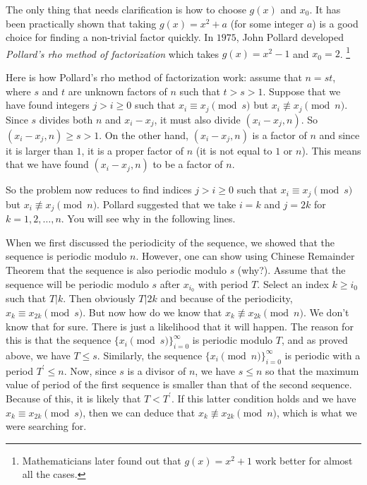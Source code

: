 \documentclass{subfiles}
\begin{document}
	The only thing that needs clarification is how to choose $g(x)$ and $x_0$. It has been practically shown that taking $g(x)=x^2+a$ (for some integer $a$) is a good choice for finding a non-trivial factor quickly.
	In $1975$, John Pollard developed \emph{Pollard's rho method of factorization} which takes $g(x)=x^2-1$ and $x_0=2$. \footnote{Mathematicians later found out that $g(x)=x^2+1$ work better for almost all the cases.}

	Here is how Pollard's rho method of factorization work: assume that $n=st$, where $s$ and $t$ are unknown factors of $n$ such that $t>s>1$. Suppose that we have found integers $j>i\geq 0$ such that $x_i \equiv x_j \pmod s$ but $x_i \not \equiv x_j \pmod n$. Since $s$ divides both $n$ and $x_i-x_j$, it must also divide $(x_i-x_j, n)$. So $(x_i-x_j, n) \geq s >1$. On the other hand, $(x_i-x_j, n)$ is a factor of $n$ and since it is larger than $1$, it is a proper factor of $n$ (it is not equal to $1$ or $n$). This means that we have found $(x_i-x_j, n)$ to be a factor of $n$.

	So the problem now reduces to find indices $j>i \geq 0$ such that $x_i \equiv x_j \pmod s$ but $x_i \not \equiv x_j \pmod n$. Pollard suggested that we take $i=k$ and $j=2k$ for $k=1,2,\ldots, n$. You will see why in the following lines.

	When we first discussed the periodicity of the sequence, we showed that the sequence is periodic modulo $n$. However, one can show using Chinese Remainder Theorem that the sequence is also periodic modulo $s$ (why?). Assume that the sequence will be periodic modulo $s$ after $x_{i_0}$ with period $T$. Select an index $k \geq i_0$ such that $T|k$. Then obviously $T|2k$ and because of the periodicity, $x_{k} \equiv x_{2k} \pmod s$. But now how do we know that $x_{k} \not \equiv x_{2k} \pmod n$. We don't know that for sure. There is just a likelihood that it will happen. The reason for this is that the sequence $\{x_i \pmod s\}_{i=0}^{\infty}$ is periodic modulo $T$, and as proved above, we have $T \leq s$. Similarly, the sequence $\{x_i \pmod n\}_{i=0}^{\infty}$ is periodic with a period $T^{\prime} \leq n$. Now, since $s$ is a divisor of $n$, we have $s \leq n$ so that the maximum value of period of the first sequence is smaller than that of the second sequence. Because of this, it is likely that $T<T^{\prime}$. If this latter condition holds and we have $x_{k}\equiv x_{2k} \pmod s$, then we can deduce that $x_k \not \equiv x_{2k} \pmod n$, which is what we were searching for.
\end{document}
